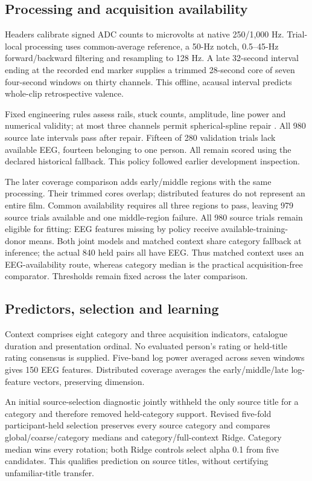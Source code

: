 \documentclass[10pt,letterpaper]{article}
\begin{document}
\subsection{Processing and acquisition availability}
Headers calibrate signed ADC counts to microvolts at native 250/1,000 Hz. Trial-local processing uses common-average reference, a 50-Hz notch, 0.5--45-Hz forward/backward filtering and resampling to 128 Hz. A late 32-second interval ending at the recorded end marker supplies a trimmed 28-second core of seven four-second windows on thirty channels. This offline, acausal interval predicts whole-clip retrospective valence.

Fixed engineering rules assess rails, stuck counts, amplitude, line power and numerical validity; at most three channels permit spherical-spline repair \cite{perrin1989spherical}. All 980 source late intervals pass after repair. Fifteen of 280 validation trials lack available EEG, fourteen belonging to one person. All remain scored using the declared historical fallback. This policy followed earlier development inspection.

The later coverage comparison adds early/middle regions with the same processing. Their trimmed cores overlap; distributed features do not represent an entire film. Common availability requires all three regions to pass, leaving 979 source trials available and one middle-region failure. All 980 source trials remain eligible for fitting: EEG features missing by policy receive available-training-donor means. Both joint models and matched context share category fallback at inference; the actual 840 held pairs all have EEG. Thus matched context uses an EEG-availability route, whereas category median is the practical acquisition-free comparator. Thresholds remain fixed across the later comparison.

\subsection{Predictors, selection and learning}
Context comprises eight category and three acquisition indicators, catalogue duration and presentation ordinal. No evaluated person's rating or held-title rating consensus is supplied. Five-band log power averaged across seven windows gives 150 EEG features. Distributed coverage averages the early/middle/late log-feature vectors, preserving dimension.

An initial source-selection diagnostic jointly withheld the only source title for a category and therefore removed held-category support. Revised five-fold participant-held selection preserves every source category and compares global/coarse/category medians and category/full-context Ridge. Category median wins every rotation; both Ridge controls select alpha 0.1 from five candidates. This qualifies prediction on source titles, without certifying unfamiliar-title transfer.
\end{document}
